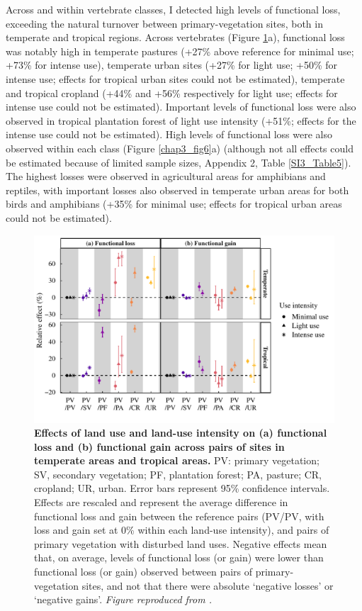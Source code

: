 Across and within vertebrate classes, I detected high levels of functional loss, exceeding the natural turnover between primary-vegetation sites, both in temperate and tropical regions. Across vertebrates (Figure \ref{chap3_fig5}a), functional loss was notably high in temperate pastures (+27\% above reference for minimal use; +73\% for intense use), temperate urban sites (+27\% for light use; +50\% for intense use; effects for tropical urban sites could not be estimated), temperate and tropical cropland (+44\% and +56\% respectively for light use; effects for intense use could not be estimated). Important levels of functional loss were also observed in tropical plantation forest of light use intensity (+51\%; effects for the intense use could not be estimated). High levels of functional loss were also observed within each class (Figure \ref{chap3_fig6}a) (although not all effects could be estimated because of limited sample sizes, Appendix 2, Table \ref{SI3_Table5}). The highest losses were observed in agricultural areas for amphibians and reptiles, with important losses also observed in temperate urban areas for both birds and amphibians (+35\% for minimal use; effects for tropical urban areas could not be estimated).

\begin{figure}[h!]
\centering
\includegraphics[scale=0.75]{figures/Chapter_FD/Figure5}
\caption[Effects of land use and land-use intensity on (a) functional loss and (b) functional gain across pairs of sites in temperate areas and tropical areas.]{\textbf{Effects of land use and land-use intensity on (a) functional loss and (b) functional gain across pairs of sites in temperate areas and tropical areas.} PV: primary vegetation; SV, secondary vegetation; PF, plantation forest; PA, pasture; CR, cropland; UR, urban. Error bars represent 95\% confidence intervals. Effects are rescaled and represent the average difference in functional loss and gain between the reference pairs (PV/PV, with loss and gain set at 0\% within each land-use intensity), and pairs of primary vegetation with disturbed land uses. Negative effects mean that, on average, levels of functional loss (or gain) were lower than functional loss (or gain) observed between pairs of primary-vegetation sites, and not that there were absolute `negative losses' or `negative gains'. \textit{Figure reproduced from \citet{Etard2022}.}}
\label{chap3_fig5}
\end{figure}

